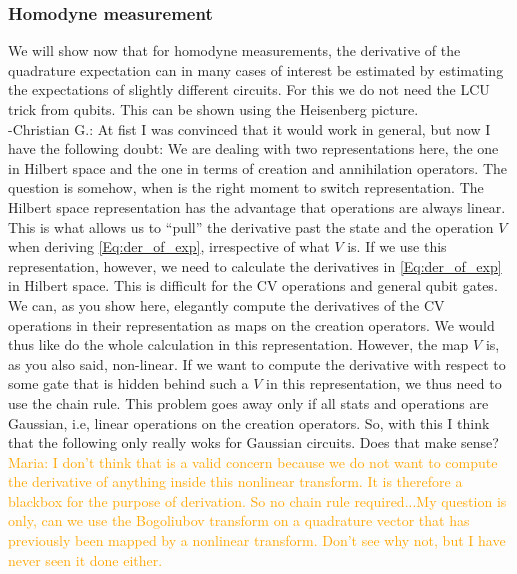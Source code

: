 \documentclass[aps,pra,10pt,twocolumn,groupedaddress,nofootinbib]{revtex4-1}
\theoremstyle{plain}
\newcommand{\maria}[1]{\textcolor{orange}{Maria: #1}}
\newcommand{\cg}[1]{\textcolor{cyan!80!black}{Christian G.: #1}}
\begin{document}
\subsubsection{Homodyne measurement}

We will show now that for homodyne measurements, the derivative of the quadrature expectation can in many cases of interest be estimated by estimating the expectations of slightly different circuits. For this we do not need the LCU trick from qubits. This can be shown using the Heisenberg picture. \\

-\cg{At fist I was convinced that it would work in general, but now I have the following doubt: We are dealing with two representations here, the one in Hilbert space and the one in terms of creation and annihilation operators. The question is somehow, when is the right moment to switch representation. The Hilbert space representation has the advantage that operations are always linear. This is what allows us to ``pull'' the derivative past the state and the operation $V$ when deriving \eqref{Eq:der_of_exp}, irrespective of what $V$ is. If we use this representation, however, we need to calculate the derivatives in \eqref{Eq:der_of_exp} in Hilbert space. This is difficult for the CV operations and general qubit gates. We can, as you show here, elegantly compute the derivatives of the CV operations in their representation as maps on the creation operators. We would thus like do the whole calculation in this representation. However, the map $V$ is, as you also said, non-linear. If we want to compute the derivative with respect to some gate that is hidden behind such a $V$ in this representation, we thus need to use the chain rule. This problem goes away only if all stats and operations are Gaussian, i.e, linear operations on the creation operators. So, with this I think that the following only really woks for Gaussian circuits. Does that make sense?}\maria{I don't think that is a valid concern because we do not want to compute the derivative of anything inside this nonlinear transform. It is therefore a blackbox for the purpose of derivation. So no chain rule required...My question is only, can we use the Bogoliubov transform on a quadrature vector that has previously been mapped by a nonlinear transform. Don't see why not, but I have never seen it done either.}
\end{document}
